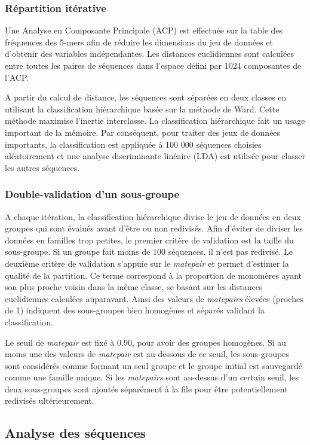 \documentclass[12pt,a4paper]{article}
\begin{document}
	\subsubsection{Répartition itérative}
Une Analyse en Composante Principale (ACP) est effectuée sur la table des fréquences des 5-mers afin de réduire les dimensions du jeu de données et d’obtenir des variables indépendantes. Les distances euclidiennes sont calculées entre toutes les paires de séquences dans l’espace défini par 1024 composantes de l’ACP. 

A partir du calcul de distance, les séquences sont séparées en deux classes en utilisant la classification hiérarchique basée sur la méthode de Ward. Cette méthode maximise l’inertie interclasse. La classification hiérarchique fait un usage important de la mémoire. Par conséquent, pour traiter des jeux de données importants, la classification est appliquée à 100 000 séquences choisies aléatoirement et une analyse discriminante linéaire (LDA) est utilisée pour classer les autres séquences.

	\subsubsection{Double-validation d'un sous-groupe}
A chaque itération, la classification hiérarchique divise le jeu de données en deux groupes qui sont évalués avant d'être ou non redivisés. Afin d'éviter de diviser les données en familles trop petites, le premier critère de validation est la taille du sous-groupe. Si un groupe fait moins de 100 séquences, il n'est pas redivisé. Le deuxième critère de validation s'appuie sur le \textit{matepair} et permet d'estimer la qualité de la partition. Ce terme correspond à la proportion de monomères ayant son plus proche voisin dans la même classe, se basant sur les distances euclidiennes calculées auparavant. Ainsi des valeurs de \textit{matepairs} élevées (proches de 1) indiquent des sous-groupes bien homogènes et séparés validant la classification.

Le seuil de \textit{matepair} est fixé à 0.90, pour avoir des groupes homogènes. Si au moins une des valeurs de \textit{matepair} est au-dessous de ce seuil, les sous-groupes sont considérés comme formant un seul groupe et le groupe initial est sauvegardé comme une famille unique. Si les \textit{matepairs} sont au-dessus d’un certain seuil, les deux sous-groupes sont ajoutés séparément à la file pour être potentiellement redivisés ultérieurement.

	\subsection{Analyse des séquences}
	
\end{document}
